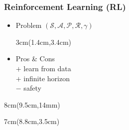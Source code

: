 \documentclass[navbaroff]{sdqbeamer}
\begin{document}
\begin{frame}[label={intro}]
\frametitle{Reinforcement Learning (RL)}
    \begin{itemize}
    \item Problem $(\mathcal{S,A,P,R}, \gamma)$\\
    \vspace{35mm}
        \begin{textblock*}{3cm}(1.4cm,3.4cm)
        \end{textblock*}
    \pause
    \pause
    \item Pros \& Cons\\
        \pause
        \textcolor{myred}{$\boldsymbol{+}$} learn from data\\
        \pause
        \textcolor{myred}{$\boldsymbol{+}$} infinite horizon\\
        \pause
        \textcolor{myblue}{$\boldsymbol{-}$} safety\\
    \end{itemize}
    \begin{textblock*}{8cm}(9.5cm,14mm)
    \end{textblock*}
    \begin{textblock*}{7cm}(8.8cm,3.5cm)
    \end{textblock*}
\end{frame}
\end{document}
